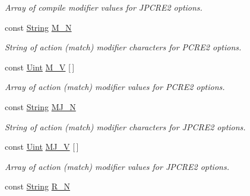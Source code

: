 \begin{DoxyCompactItemize}
\begin{DoxyCompactList}\small\item\em Array of compile modifier values for J\+P\+C\+R\+E2 options. \end{DoxyCompactList}\item 
const \hyperlink{namespacejpcre2_a91f03070152fb228bc116c5a737f1d16}{String} \hyperlink{namespacejpcre2_1_1MOD_ae9029cd8600f49ba50ae0c7e42804a91}{M\+\_\+N}\hypertarget{namespacejpcre2_1_1MOD_ae9029cd8600f49ba50ae0c7e42804a91}{}\label{namespacejpcre2_1_1MOD_ae9029cd8600f49ba50ae0c7e42804a91}

\begin{DoxyCompactList}\small\item\em String of action (match) modifier characters for P\+C\+R\+E2 options. \end{DoxyCompactList}\item 
const \hyperlink{namespacejpcre2_a078242d38221a13fb3543b9edd78c099}{Uint} \hyperlink{namespacejpcre2_1_1MOD_a7dd2150647fee002204e7005aa126289}{M\+\_\+V} \mbox{[}$\,$\mbox{]}\hypertarget{namespacejpcre2_1_1MOD_a7dd2150647fee002204e7005aa126289}{}\label{namespacejpcre2_1_1MOD_a7dd2150647fee002204e7005aa126289}

\begin{DoxyCompactList}\small\item\em Array of action (match) modifier values for P\+C\+R\+E2 options. \end{DoxyCompactList}\item 
const \hyperlink{namespacejpcre2_a91f03070152fb228bc116c5a737f1d16}{String} \hyperlink{namespacejpcre2_1_1MOD_a079cc9fcb1e7eeab134b2146d4d67fe8}{M\+J\+\_\+N}\hypertarget{namespacejpcre2_1_1MOD_a079cc9fcb1e7eeab134b2146d4d67fe8}{}\label{namespacejpcre2_1_1MOD_a079cc9fcb1e7eeab134b2146d4d67fe8}

\begin{DoxyCompactList}\small\item\em String of action (match) modifier characters for J\+P\+C\+R\+E2 options. \end{DoxyCompactList}\item 
const \hyperlink{namespacejpcre2_a078242d38221a13fb3543b9edd78c099}{Uint} \hyperlink{namespacejpcre2_1_1MOD_a02e60618af8087b9a99ae8fbed0b887c}{M\+J\+\_\+V} \mbox{[}$\,$\mbox{]}\hypertarget{namespacejpcre2_1_1MOD_a02e60618af8087b9a99ae8fbed0b887c}{}\label{namespacejpcre2_1_1MOD_a02e60618af8087b9a99ae8fbed0b887c}

\begin{DoxyCompactList}\small\item\em Array of action (match) modifier values for J\+P\+C\+R\+E2 options. \end{DoxyCompactList}\item 
const \hyperlink{namespacejpcre2_a91f03070152fb228bc116c5a737f1d16}{String} \hyperlink{namespacejpcre2_1_1MOD_a122c288202e5ffc105b93fac5a7335bf}{R\+\_\+N}\hypertarget{namespacejpcre2_1_1MOD_a122c288202e5ffc105b93fac5a7335bf}{}\label{namespacejpcre2_1_1MOD_a122c288202e5ffc105b93fac5a7335bf}


\end{DoxyCompactItemize}
